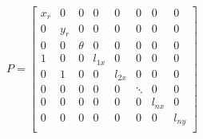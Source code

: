 \documentclass[11pt]{report}
\begin{document}
$$
P =
\begin{bmatrix}
    x_r & 0 & 0 & 0 & 0 & 0 & 0 & 0 \\
    0 & y_r & 0 & 0 & 0 & 0 & 0 & 0 \\
    0 & 0 & \theta & 0 & 0 & 0 & 0 & 0 \\
    1 & 0 & 0 & l_{1x} & 0 & 0 & 0 & 0 \\
    0 & 1 & 0 & 0 & l_{2x} & 0 & 0 & 0 \\
    0 & 0 & 0 & 0 & 0 & \ddots & 0 & 0 \\
    0 & 0 & 0 & 0 & 0 & 0 & l_{nx} & 0 \\
    0 & 0 & 0 & 0 & 0 & 0 & 0 & l_{ny} \\
\end{bmatrix}
$$

    \medskip
    
\end{document}
